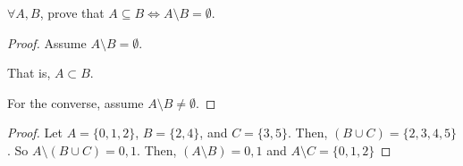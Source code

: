 \documentclass[12pt]{article}
\begin{document}
$\forall A,B$, prove that $A \subseteq B \iff A \setminus B = \emptyset$.

\begin{proof}
    Assume $A \setminus B = \emptyset$.


    That is, $A \subset B$.


    For the converse, assume $A \setminus B \neq \emptyset$.
\end{proof}

\newpage{}

\begin{proof}
    Let $A = \{0, 1 ,2\}$, $B = \{2, 4\}$, and $C = \{ 3,5\}$.
    Then, $(B \cup C) = \{2, 3, 4, 5\}$. So $A \setminus (B \cup C) = {0, 1}$.
    Then, $(A \setminus B) = {0, 1}$ and $A \setminus C = \{ 0,1,2\}$
\end{proof}
\end{document}
